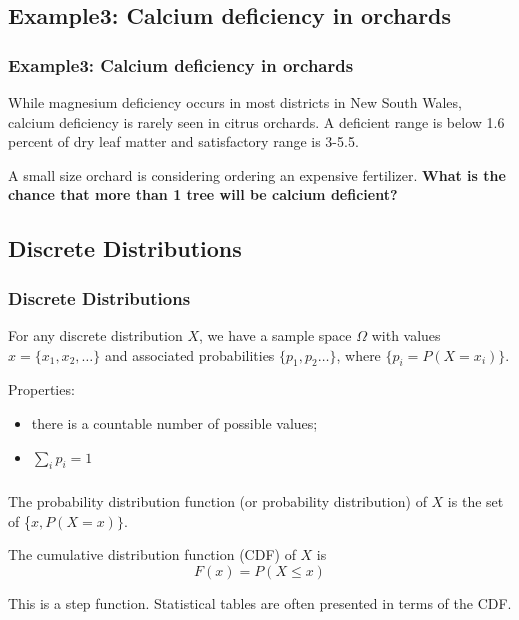 \documentclass[t,xcolor=pdftex,dvipsnames,table]{beamer}
\begin{document}
\subsection{Example3: Calcium deficiency in orchards}
\begin{frame}\frametitle{Example3: Calcium deficiency in orchards}

While magnesium deficiency occurs in most districts in New South Wales, calcium deficiency is rarely seen in citrus orchards. A deficient range is below 1.6 percent of dry leaf matter and satisfactory range is 3-5.5.

\vspace{.5cm}
A small size orchard is considering ordering an expensive fertilizer. {\bf What is the chance that more than 1 tree will be calcium deficient?}

\vspace{.5cm}
\href{http://www.dpi.nsw.gov.au/agriculture/horticulture/citrus/management/nutrition/nutrition}{}
\end{frame}


\subsection{Discrete Distributions}
\begin{frame}\frametitle{Discrete Distributions}
\begin{definition}

For any \alert{discrete} distribution $X$, we have a sample space $\Omega$ with values $x= \{ x_{1}, x_{2}, \ldots \}$ and associated probabilities $\{ p_{1}, p_{2} \ldots \}$, where $\{ p_{i} = P(X=x_{i}) \}$.

\vspace{.5cm}
Properties: 
\begin{itemize}
\item there is a countable number of possible values;
\item $\sum_{i} p_{i} = 1$
\end{itemize}
\end{definition}
\end{frame}

\begin{frame}\frametitle{}
\begin{definition}
The probability distribution function (or probability distribution) of $X$ is 
the set of \{$x, P(X=x) \}$.
\end{definition}

\vspace{.5cm}
\begin{definition}

The cumulative distribution function (CDF) of $X$ is 
\[ F(x) = P(X \leq x) \]

This is a step function. Statistical tables are often presented in terms of the CDF.
\end{definition}
\end{frame}
\end{document}

